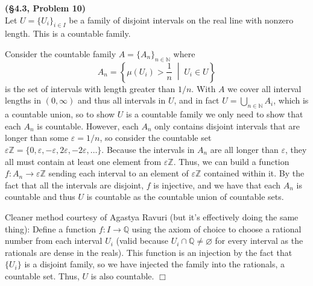 \documentclass[12pt]{article}
\theoremstyle{definition}
\newenvironment{Solution}{\noindent {\sc Solution.}}{$\Box$ \vspace{2 ex}}
\begin{document}
\vspace{0.5cm}

\begin{Solution}
{\bf (\S4.3, Problem 10)}\\
Let $U=\{U_i\}_{i\in I}$ be a family of disjoint intervals on the real line with nonzero length. This is a countable family. 

Consider the countable family $A=\{A_n\}_{n \in \mathbb N}$ where \[A_n = \left\{ \mu(U_i) > \frac{1}{n} \;\middle\vert\; U_i \in U \right\}\] is the set of intervals with length greater than $1/n$. With $A$ we cover all interval lengths in $(0,\infty)$ and thus all intervals in $U$, and in fact $U = \bigcup_{n\in \mathbb N} A_i$, which is a countable union, so to show $U$ is a countable family we only need to show that each $A_n$ is countable. However, each $A_n$ only contains disjoint intervals that are longer than some $\varepsilon = 1/n$, so consider the countable set $\varepsilon\mathbb Z = \{0,\varepsilon,-\varepsilon,2\varepsilon,-2\varepsilon,\dots\}$. Because the intervals in $A_n$ are all longer than $\varepsilon$, they all must contain at least one element from $\varepsilon \mathbb Z$. Thus, we can build a function $ f:A_n \to \varepsilon \mathbb Z$ sending each interval to an element of $\varepsilon \mathbb Z$ contained within it. By the fact that all the intervals are disjoint, $f$ is injective, and we have that each $A_n$ is countable and thus $U$ is countable as the countable union of countable sets.

Cleaner method courtesy of Agastya Ravuri (but it's effectively doing the same thing): Define a function $f : I \to \mathbb Q$ using the axiom of choice to choose a rational number from each interval $U_i$ (valid because $U_i \cap \mathbb Q \ne \varnothing$ for every interval as the rationals are dense in the reals). This function is an injection by the fact that $\{U_i\}$ is a disjoint family, so we have injected the family into the rationals, a countable set. Thus, $U$ is also countable.
\end{Solution}
\end{document}
